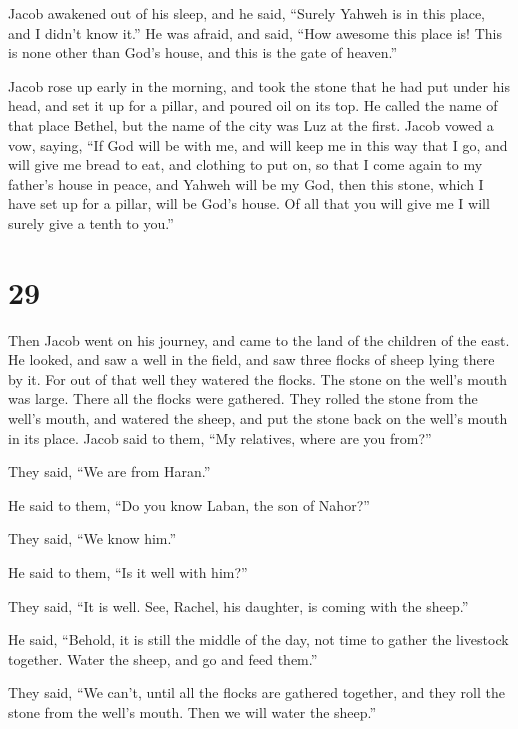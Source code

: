  Jacob awakened out of his sleep, and he said, ``Surely
Yahweh is in this place, and I didn't know it.''  He was
afraid, and said, ``How awesome this place is! This is none other than
God's house, and this is the gate of heaven.''

 Jacob rose up early in the morning, and took the stone
that he had put under his head, and set it up for a pillar, and poured
oil on its top.  He called the name of that place Bethel,
but the name of the city was Luz at the first.  Jacob vowed
a vow, saying, ``If God will be with me, and will keep me in this way
that I go, and will give me bread to eat, and clothing to put on,
 so that I come again to my father's house in peace, and
Yahweh will be my God,  then this stone, which I have set
up for a pillar, will be God's house. Of all that you will give me I
will surely give a tenth to you.''

\hypertarget{section-28}{%
\section{29}\label{section-28}}

 Then Jacob went on his journey, and came to the land of the
children of the east.  He looked, and saw a well in the
field, and saw three flocks of sheep lying there by it. For out of that
well they watered the flocks. The stone on the well's mouth was large.
 There all the flocks were gathered. They rolled the stone
from the well's mouth, and watered the sheep, and put the stone back on
the well's mouth in its place.  Jacob said to them, ``My
relatives, where are you from?''

They said, ``We are from Haran.''

 He said to them, ``Do you know Laban, the son of Nahor?''

They said, ``We know him.''

 He said to them, ``Is it well with him?''

They said, ``It is well. See, Rachel, his daughter, is coming with the
sheep.''

 He said, ``Behold, it is still the middle of the day, not
time to gather the livestock together. Water the sheep, and go and feed
them.''

 They said, ``We can't, until all the flocks are gathered
together, and they roll the stone from the well's mouth. Then we will
water the sheep.''

